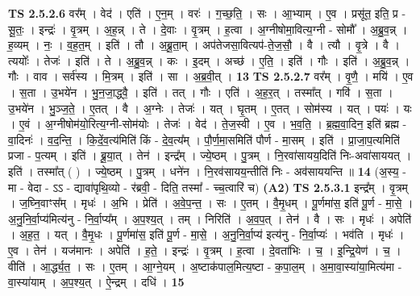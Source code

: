 \documentclass[17pt]{extarticle}
\begin{document}
                  \newline
                                \textbf{ TS 2.5.2.6} \newline
                  वर᳚म् । वेद॑ । एति॑ । ए॒न॒म् । वरः॑ । ग॒च्छ॒ति॒ । सः । आ॒भ्याम् । ए॒व । प्रसू॑त॒ इति॒ प्र - सू॒तः॒ । इन्द्रः॑ । वृ॒त्रम् । अ॒ह॒न्न् । ते । दे॒वाः । वृ॒त्रम् । ह॒त्वा । अ॒ग्नीषोमा॒वित्य॒ग्नी - सोमौ᳚ । अ॒ब्रु॒व॒न्न् । ह॒व्यम् । नः॒ । व॒ह॒त॒म् । इति॑ । तौ । अ॒ब्रू॒ता॒म् । अप॑तेजसा॒वित्यप॑-ते॒ज॒सौ॒ । वै । त्यौ । वृ॒त्रे । वै । त्ययोः᳚ । तेजः॑ । इति॑ । ते । अ॒ब्रु॒व॒न्न् । कः । इ॒दम् । अच्छ॑ । ए॒ति॒ । इति॑ । गौः । इति॑ । अ॒ब्रु॒व॒न्न् । गौः । वाव । सर्व॑स्य । मि॒त्रम् । इति॑ । सा । अ॒ब्र॒वी॒त् । \textbf{  13} \newline
                  \newline
                                \textbf{ TS 2.5.2.7} \newline
                  वर᳚म् । वृ॒णै॒ । मयि॑ । ए॒व । स॒ता । उ॒भये॑न । भु॒न॒जा॒द्ध्वै॒ । इति॑ । तत् । गौः । एति॑ । अ॒ह॒र॒त् । तस्मा᳚त् । गवि॑ । स॒ता । उ॒भये॑न । भु॒ञ्ज॒ते॒ । ए॒तत् । वै । अ॒ग्नेः । तेजः॑ । यत् । घृ॒तम् । ए॒तत् । सोम॑स्य । यत् । पयः॑ । यः । ए॒वं । अ॒ग्नीषोम॑यो॒रित्य॒ग्नी-सोम॑योः । तेजः॑ । वेद॑ । ते॒ज॒स्वी । ए॒व । भ॒व॒ति॒ । ब्र॒ह्म॒वा॒दिन॒ इति॑ ब्रह्म - वा॒दिनः॑ । व॒द॒न्ति॒ । कि॒दें॒व॒त्य॑मिति॑ किं - दे॒व॒त्य᳚म् । पौ॒र्ण॒मा॒समिति॑ पौर्ण - मा॒सम् । इति॑ । प्रा॒जा॒प॒त्यमिति॑ प्रजा - प॒त्यम् । इति॑ । ब्रू॒या॒त् । तेन॑ । इन्द्र᳚म् । ज्ये॒ष्ठम् । पु॒त्रम् । नि॒रवा॑सायय॒दिति॑ निः-अवा॑साययत् । इति॑ । तस्मा᳚त् ( ) । ज्ये॒ष्ठम् । पु॒त्रम् । धने॑न । नि॒रव॑सायय॒न्तीति॑ निः - अव॑साययन्ति ॥ \textbf{  14} \newline
                  \newline
                      (अ॒स्य॒ - मा - वेदा - ऽऽ - द्यावा॑पृथि॒व्यो - र॑ब्रवी॒ - दिति॒ तस्मा᳚ - च्च॒त्वारि॑ च)  \textbf{(A2)} \newline \newline
                                \textbf{ TS 2.5.3.1} \newline
                  इन्द्र᳚म् । वृ॒त्रम् । ज॒घ्नि॒वाꣳस᳚म् । मृधः॑ । अ॒भि । प्रेति॑ । अ॒वे॒प॒न्त॒ । सः । ए॒तम् । वै॒मृ॒धम् । पू॒र्णमा॑स॒ इति॑ पू॒र्ण - मा॒से॒ । अ॒नु॒नि॒र्वा॒प्य॑मित्य॑नु - नि॒र्वा॒प्य᳚म् । अ॒प॒श्य॒त् । तम् । निरिति॑ । अ॒व॒प॒त् । तेन॑ । वै । सः । मृधः॑ । अपेति॑ । अ॒ह॒त॒ । यत् । वै॒मृ॒धः । पू॒र्णमा॑स॒ इति॑ पू॒र्ण - मा॒से॒ । अ॒नु॒नि॒र्वा॒प्य॑ इत्य॑नु - नि॒र्वा॒प्यः॑ । भव॑ति । मृधः॑ । ए॒व । तेन॑ । यज॑मानः । अपेति॑ । ह॒ते॒ । इन्द्रः॑ । वृ॒त्रम् । ह॒त्वा । दे॒वता॑भिः । च॒ । इ॒न्द्रि॒येण॑ । च॒ । वीति॑ । आ॒र्द्ध्य॒त॒ । सः । ए॒तम् । आ॒ग्ने॒यम् । अ॒ष्टाक॑पाल॒मित्य॒ष्टा - क॒पा॒ल॒म् । अ॒मा॒वा॒स्या॑या॒मित्य॑मा - वा॒स्या॑याम् । अ॒प॒श्य॒त् । ऐ॒न्द्रम् । दधि॑ । \textbf{  15} \newline
\end{document}

